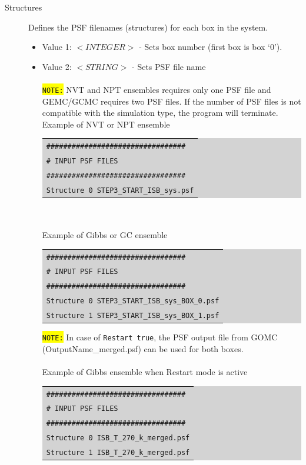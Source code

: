 \begin{description}
\item [Structures] Defines the PSF filenames (structures) for each box in the system.
	\begin{itemize}	
	\item Value 1: $<INTEGER>$ - Sets box number (first box is box `0').\\
	\item Value 2: $<STRING>$ - Sets PSF file name\\\\
	\colorbox{yellow}{\texttt{NOTE:}} NVT and NPT ensembles requires only one PSF file and GEMC/GCMC requires two PSF files. If the number of PSF files is not compatible with the simulation type, the program will terminate. \\
	
	Example of NVT or NPT ensemble\\
	\colorbox{lightgray}{
	\begin{tabular}{l}
	\texttt{\#\#\#\#\#\#\#\#\#\#\#\#\#\#\#\#\#\#\#\#\#\#\#\#\#\#\#\#\#\#\#\#\#}\\
	\texttt{\# INPUT PSF FILES}\\
	\texttt{\#\#\#\#\#\#\#\#\#\#\#\#\#\#\#\#\#\#\#\#\#\#\#\#\#\#\#\#\#\#\#\#\#}\\
	\texttt{Structure 0 STEP3\_START\_ISB\_sys.psf}\\
	\end{tabular}}\\\\
	Example of Gibbs or GC ensemble\\
	\colorbox{lightgray}{
	\begin{tabular}{l}
	\texttt{\#\#\#\#\#\#\#\#\#\#\#\#\#\#\#\#\#\#\#\#\#\#\#\#\#\#\#\#\#\#\#\#\#}\\
	\texttt{\# INPUT PSF FILES}\\
	\texttt{\#\#\#\#\#\#\#\#\#\#\#\#\#\#\#\#\#\#\#\#\#\#\#\#\#\#\#\#\#\#\#\#\#}\\
	\texttt{Structure 0 STEP3\_START\_ISB\_sys\_BOX\_0.psf}\\
	\texttt{Structure 1 STEP3\_START\_ISB\_sys\_BOX\_1.psf}\\
	\end{tabular}}
	
	\colorbox{yellow}{\texttt{NOTE:}} In case of \texttt{Restart   true}, the PSF output file from GOMC (OutputName\_merged.psf) can be used for both boxes. \\\\
	Example of Gibbs ensemble when Restart mode is active\\
	\colorbox{lightgray}{
	\begin{tabular}{l}
	\texttt{\#\#\#\#\#\#\#\#\#\#\#\#\#\#\#\#\#\#\#\#\#\#\#\#\#\#\#\#\#\#\#\#\#}\\
	\texttt{\# INPUT PSF FILES}\\
	\texttt{\#\#\#\#\#\#\#\#\#\#\#\#\#\#\#\#\#\#\#\#\#\#\#\#\#\#\#\#\#\#\#\#\#}\\
	\texttt{Structure 0 ISB\_T\_270\_k\_merged.psf}\\
	\texttt{Structure 1 ISB\_T\_270\_k\_merged.psf}\\
	\end{tabular}}
	\end{itemize}
	

\end{description}
